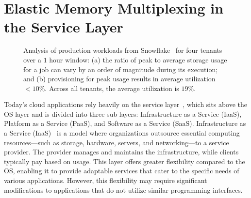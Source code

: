 \chapter{Elastic Memory Multiplexing in the Service Layer}
\label{chap:service}

\begin{figure}[t]
  \centering
  \caption[Snowflake workload anaylsis.]{\small{Analysis of production workloads from Snowflake~\cite{snowset} for four tenants over a $1$ hour window: (a) the ratio of peak to average storage usage for a job can vary by an order of magnitude during its execution; and (b) provisioning for peak usage results in average utilization $<10\%$. Across all tenants, the average utilization is $19\%$.}}\label{fig:ephemerals}%
\end{figure}

Today's cloud applications rely heavily on the service layer~\cite{service1, service2, service3, service4, service5}, which sits above the OS layer and is divided into three sub-layers: Infrastructure as a Service (IaaS), Platform as a Service (PaaS), and Software as a Service (SaaS). Infrastructure as a Service (IaaS)~\cite{iaas1, iaas2} is a model where organizations outsource essential computing resources—such as storage, hardware, servers, and networking—to a service provider. The provider manages and maintains the infrastructure, while clients typically pay based on usage. This layer offers greater flexibility compared to the OS, enabling it to provide adaptable services that cater to the specific needs of various applications. However, this flexibility may require significant modifications to applications that do not utilize similar programming interfaces.


